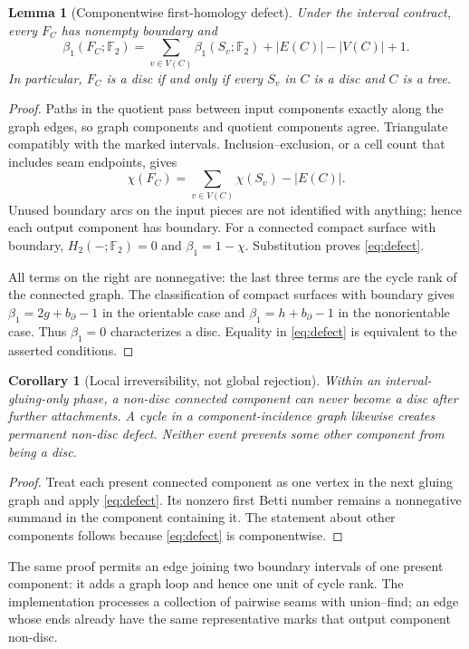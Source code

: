 \documentclass[11pt,letterpaper]{article}
\newtheorem{lemma}[theorem]{Lemma}
\newtheorem{corollary}[theorem]{Corollary}
\theoremstyle{definition}
\newcommand{\F}{\mathbb F}
\begin{document}
\begin{lemma}[Componentwise first-homology defect]\label{lem:defect}
Under the interval contract, every $F_C$ has nonempty boundary and
\begin{equation}
 \beta_1(F_C;\F_2)=\sum_{v\in V(C)}\beta_1(S_v;\F_2)
                          +|E(C)|-|V(C)|+1.\label{eq:defect}
\end{equation}
In particular, $F_C$ is a disc if and only if every $S_v$ in $C$ is a disc and $C$ is a tree.
\end{lemma}
\begin{proof}
Paths in the quotient pass between input components exactly along the graph edges, so graph components and quotient components agree. Triangulate compatibly with the marked intervals. Inclusion--exclusion, or a cell count that includes seam endpoints, gives
\[
 \chi(F_C)=\sum_{v\in V(C)}\chi(S_v)-|E(C)|.
\]
Unused boundary arcs on the input pieces are not identified with anything; hence each output component has boundary. For a connected compact surface with boundary, $H_2(-;\F_2)=0$ and $\beta_1=1-\chi$. Substitution proves \eqref{eq:defect}.

All terms on the right are nonnegative: the last three terms are the cycle rank of the connected graph. The classification of compact surfaces with boundary gives $\beta_1=2g+b_\partial-1$ in the orientable case and $\beta_1=h+b_\partial-1$ in the nonorientable case. Thus $\beta_1=0$ characterizes a disc. Equality in \eqref{eq:defect} is equivalent to the asserted conditions.
\end{proof}

\begin{corollary}[Local irreversibility, not global rejection]\label{cor:bad}
Within an interval-gluing-only phase, a non-disc connected component can never become a disc after further attachments. A cycle in a component-incidence graph likewise creates permanent non-disc defect. Neither event prevents some other component from being a disc.
\end{corollary}
\begin{proof}
Treat each present connected component as one vertex in the next gluing graph and apply \eqref{eq:defect}. Its nonzero first Betti number remains a nonnegative summand in the component containing it. The statement about other components follows because \eqref{eq:defect} is componentwise.
\end{proof}

The same proof permits an edge joining two boundary intervals of one present component: it adds a graph loop and hence one unit of cycle rank. The implementation processes a collection of pairwise seams with union--find; an edge whose ends already have the same representative marks that output component non-disc.
\end{document}
